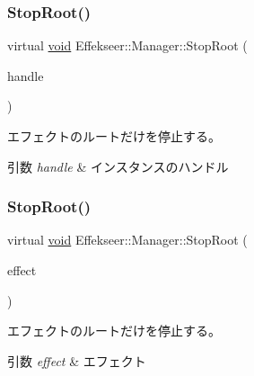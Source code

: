 \subsubsection{\texorpdfstring{Stop\+Root()}{StopRoot()}\hspace{0.1cm}{\footnotesize\ttfamily [1/2]}}
{\footnotesize\ttfamily virtual \mbox{\hyperlink{namespace_effekseer_ab34c4088e512200cf4c2716f168deb56}{void}} Effekseer\+::\+Manager\+::\+Stop\+Root (\begin{DoxyParamCaption}\item[{\mbox{\hyperlink{namespace_effekseer_afba58b8d812da862190e9bbfc040824a}{Handle}}}]{handle }\end{DoxyParamCaption})\hspace{0.3cm}{\ttfamily [pure virtual]}}



エフェクトのルートだけを停止する。 


\begin{DoxyParams}{引数}
{\em handle} & インスタンスのハンドル \\
\hline
\end{DoxyParams}
\mbox{\label{class_effekseer_1_1_manager_ad7989b68ceb3125cf6ef0d4062462a3d}} 
\subsubsection{\texorpdfstring{Stop\+Root()}{StopRoot()}\hspace{0.1cm}{\footnotesize\ttfamily [2/2]}}
{\footnotesize\ttfamily virtual \mbox{\hyperlink{namespace_effekseer_ab34c4088e512200cf4c2716f168deb56}{void}} Effekseer\+::\+Manager\+::\+Stop\+Root (\begin{DoxyParamCaption}\item[{\mbox{\hyperlink{class_effekseer_1_1_effect}{Effect}} $\ast$}]{effect }\end{DoxyParamCaption})\hspace{0.3cm}{\ttfamily [pure virtual]}}



エフェクトのルートだけを停止する。 


\begin{DoxyParams}{引数}
{\em effect} & エフェクト \\
\hline
\end{DoxyParams}
\mbox{\label{class_effekseer_1_1_manager_ac086ec64cb5f99172e8bf655b77e1464}} 
